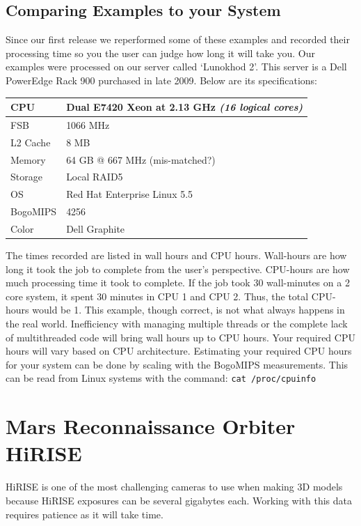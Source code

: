 \subsection{Comparing Examples to your System}

Since our first release we reperformed some of these examples and
recorded their processing time so you the user can judge how long it
will take you. Our examples were processed on our server called
`Lunokhod 2'. This server is a Dell PowerEdge Rack 900 purchased in
late 2009. Below are its specifications:

\begin{center}
\begin{tabular}{ l | l }
CPU & Dual E7420 Xeon at 2.13 GHz \emph{(16 logical cores)} \\ \hline
FSB & 1066 MHz \\ \hline
L2 Cache & 8 MB \\ \hline
Memory & 64 GB @ 667 MHz (mis-matched?) \\ \hline
Storage & Local RAID5 \\ \hline
OS & Red Hat Enterprise Linux 5.5 \\ \hline
BogoMIPS & 4256 \\ \hline
Color & Dell Graphite \\
\end{tabular}
\end{center}

The times recorded are listed in wall hours and CPU hours. Wall-hours
are how long it took the job to complete from the user's
perspective. CPU-hours are how much processing time it took to
complete. If the job took 30 wall-minutes on a 2 core system, it spent
30 minutes in CPU 1 and CPU 2. Thus, the total CPU-hours would be
1. This example, though correct, is not what always happens in the
real world. Inefficiency with managing multiple threads or the
complete lack of multithreaded code will bring wall hours up to CPU
hours. Your required CPU hours will vary based on CPU
architecture. Estimating your required CPU hours for your system can
be done by scaling with the BogoMIPS measurements. This can be read
from Linux systems with the command: \texttt{cat /proc/cpuinfo}

\section{Mars Reconnaissance Orbiter HiRISE}

\ac{HiRISE} is one of the most challenging cameras to use when making 3D
models because \ac{HiRISE} exposures can be several gigabytes each. Working
with this data requires patience as it will take time.

